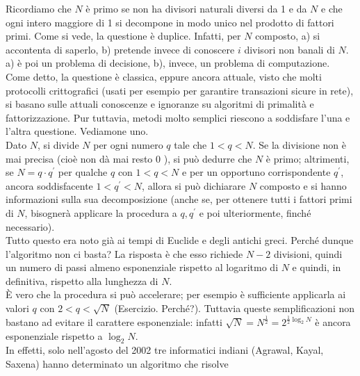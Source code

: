 \begin{enumerate}
\begin{itemize}
          \end{itemize}

          Ricordiamo che $N$ è primo se non ha divisori naturali diversi da 1 e
          da $N$ e che ogni intero maggiore di 1 si decompone in modo unico nel
          prodotto di fattori primi. Come si vede, la questione è duplice.
          Infatti, per $N$ composto, a) si accontenta di saperlo, b) pretende
          invece di conoscere $i$ divisori non banali di $N$. a) è poi un
          problema di decisione, b), invece, un problema di computazione.
          Come detto, la questione è classica, eppure ancora attuale, visto
          che molti protocolli crittografici (usati per esempio per garantire
          transazioni sicure in rete), si basano sulle attuali conoscenze e
          ignoranze su algoritmi di primalità e fattorizzazione. Pur tuttavia,
          metodi molto semplici riescono a soddisfare l'una e l'altra questione.
          Vediamone uno.\\
          Dato $N$, si divide $N$ per ogni numero $q$ tale che $1<q<N$. Se la divisione
          non è mai precisa (cioè non dà mai resto 0 ), si può dedurre che $N$ è primo;
          altrimenti, se $N=q \cdot q^{\prime}$ per qualche $q$ con $1<q<N$ e per un
          opportuno corrispondente $q^\prime$, ancora soddisfacente $1<q^\prime<N$, allora si può
          dichiarare $N$ composto e si hanno informazioni sulla sua decomposizione
          (anche se, per ottenere tutti i fattori primi di $N$, bisognerà applicare la
          procedura a $q, q^\prime$ e poi ulteriormente, finché necessario).\\
          Tutto questo era noto già ai tempi di Euclide e degli antichi greci.
          Perché dunque l'algoritmo non ci basta? La risposta è che esso richiede $N-2$
          divisioni, quindi un numero di passi almeno esponenziale rispetto al logaritmo
          di $N$ e quindi, in definitiva, rispetto alla lunghezza di $N$.\\
          È vero che la procedura si può accelerare; per esempio è sufficiente
          applicarla ai valori $q$ con $2<q<\sqrt{N}$ (Esercizio. Perché?).
          Tuttavia queste semplificazioni non bastano ad evitare il carattere
          esponenziale: infatti $\sqrt{N}=N^{\frac{1}{2}}=2^{\frac{1}{2} \log _2 N}$ è
          ancora esponenziale rispetto a $\log _2 N$.\\
          In effetti, solo nell'agosto del 2002 tre informatici indiani
          (Agrawal, Kayal, Saxena) hanno determinato un algoritmo che risolve

\end{enumerate}
